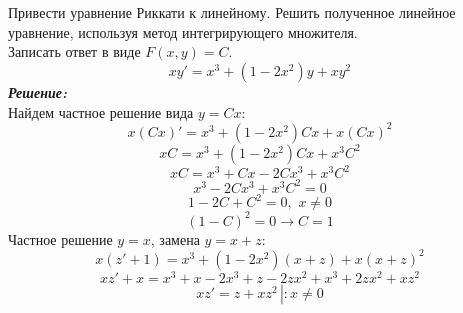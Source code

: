 \documentclass[a5paper, 10pt]{article}
\theoremstyle{definition}
\theoremstyle{plain}
\theoremstyle{remark}
\begin{document}
\section{}
Привести уравнение Риккати к линейному. Решить полученное линейное уравнение, используя метод интегрирующего множителя.\\
Записать ответ в виде $F(x, y) = C$.
\begin{equation*}
xy' = x^3 + (1 - 2x^2)y + xy^2
\end{equation*}
\textit{\textbf{Решение:}}\\
Найдем частное решение вида $y = Cx$:
\begin{equation*}
x \left(  Cx \right)' = x^3 + (1 - 2x^2) Cx + x\left(  Cx \right)^2
\end{equation*}
\begin{equation*}
x C = x^3 + (1 - 2x^2) Cx + x^3C^2
\end{equation*}
\begin{equation*}
x C = x^3 + Cx - 2Cx^3 + x^3C^2
\end{equation*}
\begin{equation*}
x^3 - 2Cx^3 + x^3C^2 = 0
\end{equation*}
\begin{equation*}
1 - 2C + C^2 = 0,  \, \, x \neq 0
\end{equation*}
\begin{equation*}
\left(1 - C \right)^2 = 0 \to C = 1
\end{equation*}
Частное решение  $y = x$, замена $y = x + z$:
\begin{equation*}
x(z' + 1) = x^3 + (1 - 2x^2)(x + z) + x(x + z)^2
\end{equation*}
\begin{equation*}
xz' + x = x^3 + x - 2x^3 + z - 2zx^2 + x^3 +2zx^2 +x z^2
\end{equation*}
\begin{equation*}
xz'  =  z +x z^2 \, \left| \right. : x \neq 0
\end{equation*}
\end{document}
